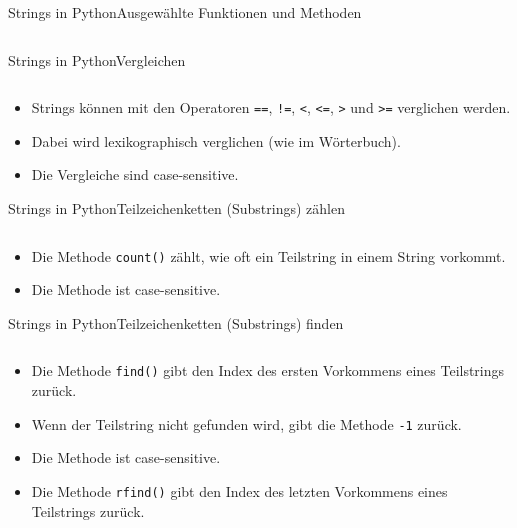 \documentclass[xelatex,aspectratio=169]{beamer}
\begin{document}
\begin{frame}{Strings in Python}{Ausgewählte Funktionen und Methoden}
    \inputminted{python}{src/strings_functions.py}
\end{frame}

\begin{frame}{Strings in Python}{Vergleichen}
    \inputminted{python}{src/strings_comparison.py}
    \begin{itemize}
        \item Strings können mit den Operatoren \texttt{==}, \texttt{!=}, \texttt{<}, \texttt{<=}, \texttt{>} und \texttt{>=} verglichen werden.
        \item Dabei wird lexikographisch verglichen (wie im Wörterbuch).
        \item Die Vergleiche sind case-sensitive.
    \end{itemize}
\end{frame}

\begin{frame}{Strings in Python}{Teilzeichenketten (Substrings) zählen}
    \inputminted{python}{src/strings_substring_count.py}
    \begin{itemize}
        \item Die Methode \texttt{count()} zählt, wie oft ein Teilstring in einem String vorkommt.
        \item Die Methode ist case-sensitive.
    \end{itemize}
\end{frame}

\begin{frame}{Strings in Python}{Teilzeichenketten (Substrings) finden}
    \inputminted{python}{src/strings_substring_find.py}
    \begin{itemize}
        \item Die Methode \texttt{find()} gibt den Index des ersten Vorkommens eines Teilstrings zurück.
        \item Wenn der Teilstring nicht gefunden wird, gibt die Methode \texttt{-1} zurück.
        \item Die Methode ist case-sensitive.
        \item Die Methode \texttt{rfind()} gibt den Index des letzten Vorkommens eines Teilstrings zurück.
    \end{itemize}
\end{frame}
\end{document}
